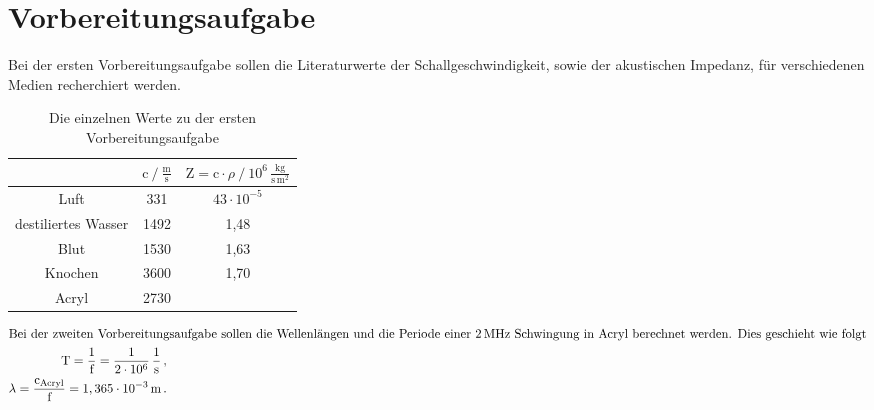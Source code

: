 \section{Vorbereitungsaufgabe}

\begin{flushleft}
    Bei der ersten Vorbereitungsaufgabe sollen die Literaturwerte der Schallgeschwindigkeit, sowie der akustischen Impedanz, für verschiedenen Medien recherchiert werden.
\end{flushleft}

\begin{table}[H]
    \centering
    \caption{Die einzelnen Werte zu der ersten Vorbereitungsaufgabe} 
    \label{Tabelle1}
    \begin{tabular} {c  c  c}
        \toprule
        {$  $} &
        {$ \text{c} \mathbin{/} \frac{\unit{\meter}}{\unit{\second}} $} &
        {$ \text{Z} = \text{c}\cdot\rho \mathbin{/} 10^{6}\,\frac{\unit{\kilo\gram}}{\unit{\second}\,\unit{\meter}^2} $} \\
        \midrule
        Luft                & 331 \cite{a1} & $43 \cdot 10^{-5}$ \cite{a1} \\
        destiliertes Wasser & 1492 \cite{a1}& 1,48 \cite{a1} \\
        Blut                & 1530 \cite{a1} & 1,63 \cite{a1} \\
        Knochen             & 3600 \cite{a1} & 1,70 \cite{a1} \\
        Acryl               & 2730 \cite{a3} &  \\
        \bottomrule
    \end{tabular} 
\end{table}

\begin{align*}
    \intertext{Bei der zweiten Vorbereitungsaufgabe sollen die Wellenlängen und die Periode einer $2\,\unit{\mega\hertz}$ Schwingung in Acryl berechnet werden. Dies geschieht wie folgt}
    \text{T} = \frac{1}{\text{f}} = \frac{1}{2\cdot 10^{6}}\,\frac{1}{\unit{\second}}\,, \\
    \lambda = \frac{\text{c}_{\text{Acryl}}}{\text{f}} = 1,365 \cdot 10^{-3}\,\unit{\meter}\,.
\end{align*}
